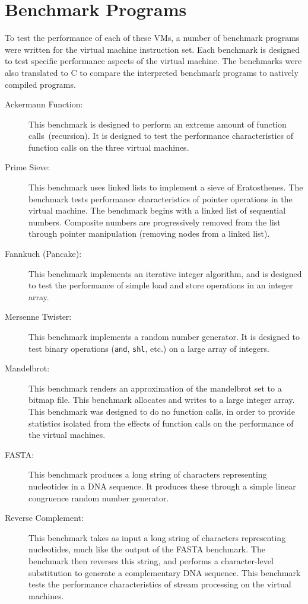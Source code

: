 	\section{Benchmark Programs}
	To test the performance of each of these VMs, a number of benchmark programs were written for the virtual machine instruction set. Each benchmark is designed to test specific performance aspects of the virtual machine. The benchmarks were also translated to C to compare the interpreted benchmark programs to natively compiled programs.
	
	\begin{description}
		\item[Ackermann Function:] This benchmark is designed to perform an extreme amount of function calls~(recursion). It is designed to test the performance characteristics of function calls on the three virtual machines.
		\item[Prime Sieve:] This benchmark uses linked lists to implement a sieve of Eratosthenes. The benchmark tests performance characteristics of pointer operations in the virtual machine. The benchmark begins with a linked list of sequential numbers. Composite numbers are progressively removed from the list through pointer manipulation (removing nodes from a linked list).
		\item[Fannkuch (Pancake):] This benchmark implements an iterative integer algorithm, and is designed to test the performance of simple load and store operations in an integer array.
		\item[Mersenne Twister:] This benchmark implements a random number generator. It is designed to test binary operations (\texttt{and}, \texttt{shl}, etc.) on a large array of integers.
		\item[Mandelbrot:] This benchmark renders an approximation of the mandelbrot set to a bitmap file. This benchmark allocates and writes to a large integer array. This benchmark was designed to do no function calls, in order to provide statistics isolated from the effects of function calls on the performance of the virtual machines.
		\item[FASTA:] This benchmark produces a long string of characters representing nucleotides in a DNA sequence. It produces these through a simple linear congruence random number generator. 
		\item[Reverse Complement:] This benchmark takes as input a long string of characters representing nucleotides, much like the output of the FASTA benchmark. The benchmark then reverses this string, and performs a character-level substitution to generate a complementary DNA sequence. This benchmark tests the performance characteristics of stream processing on the virtual machines.
	\end{description}
	
